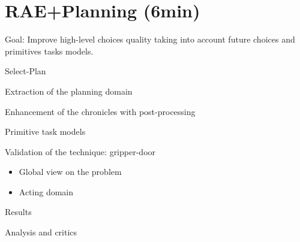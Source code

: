 \section{RAE+Planning (6min)}
\begin{frame}
    Goal: Improve high-level choices quality taking into account future choices and primitives tasks models.
\end{frame}
\begin{frame}{Select-Plan}
    
\end{frame}
\begin{frame}{Extraction of the planning domain}
    
\end{frame}
\begin{frame}{Enhancement of the chronicles with post-processing}
    
\end{frame}
\begin{frame}{Primitive task models}
    
\end{frame}
\begin{frame}{Validation of the technique: gripper-door}
    \begin{itemize}
        \item Global view on the problem
        \item Acting domain
    \end{itemize}
\end{frame}
\begin{frame}{Results}
    
\end{frame}
\begin{frame}{Analysis and critics}
    
\end{frame}